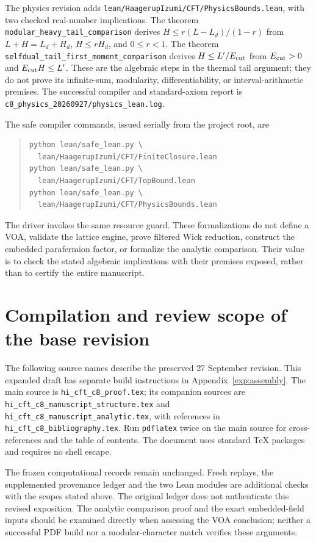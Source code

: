 \documentclass[11pt,a4paper]{article}
\theoremstyle{definition}
\newcommand{\artifact}[1]{\textnormal{\nolinkurl{#1}}}
\begin{document}
The physics revision adds
\artifact{lean/HaagerupIzumi/CFT/PhysicsBounds.lean}, with two checked
real-number implications. The theorem
\artifact{modular_heavy_tail_comparison} derives
$H\leq r(L-L_d)/(1-r)$ from $L+H=L_d+H_d$, $H\leq rH_d$, and
$0\leq r<1$. The theorem
\artifact{selfdual_tail_first_moment_comparison} derives
$H\leq L'/E_{\rm cut}$ from $E_{\rm cut}>0$ and
$E_{\rm cut}H\leq L'$. These are the algebraic steps in the thermal
tail argument; they do not prove its infinite-sum, modularity,
differentiability, or interval-arithmetic premises. The successful
compiler and standard-axiom report is
\artifact{c8_physics_20260927/physics_lean.log}.

The safe compiler commands, issued serially from the project root, are
\begin{quote}\small
\begin{verbatim}
python lean/safe_lean.py \
  lean/HaagerupIzumi/CFT/FiniteClosure.lean
python lean/safe_lean.py \
  lean/HaagerupIzumi/CFT/TopBound.lean
python lean/safe_lean.py \
  lean/HaagerupIzumi/CFT/PhysicsBounds.lean
\end{verbatim}
\end{quote}
The driver invokes the same resource guard. These formalizations do
not define a VOA, validate the lattice engine, prove filtered Wick
reduction, construct the embedded parafermion factor, or formalize
the analytic comparison.
Their value is to check the stated algebraic implications with their
premises exposed, rather than to certify the entire manuscript.

\section{Compilation and review scope of the base revision}\label{sec:compilation}
The following source names describe the preserved 27 September revision. This expanded draft has separate build instructions in Appendix~\ref{exp:assembly}.
The main source is \artifact{hi_cft_c8_proof.tex}; its companion sources
are \artifact{hi_cft_c8_manuscript_structure.tex} and
\artifact{hi_cft_c8_manuscript_analytic.tex}, with references in
\artifact{hi_cft_c8_bibliography.tex}. Run \texttt{pdflatex} twice
on the main source for cross-references and the table of contents.
The document uses standard TeX packages and requires no shell escape.

The frozen computational records remain unchanged. Fresh replays,
the supplemented provenance ledger and the two Lean modules are
additional checks with the scopes stated above. The original ledger
does not authenticate this revised exposition. The analytic comparison
proof and the exact embedded-field inputs should be examined directly
when assessing the VOA conclusion; neither a successful PDF build nor
a modular-character match verifies these arguments.
\end{document}
